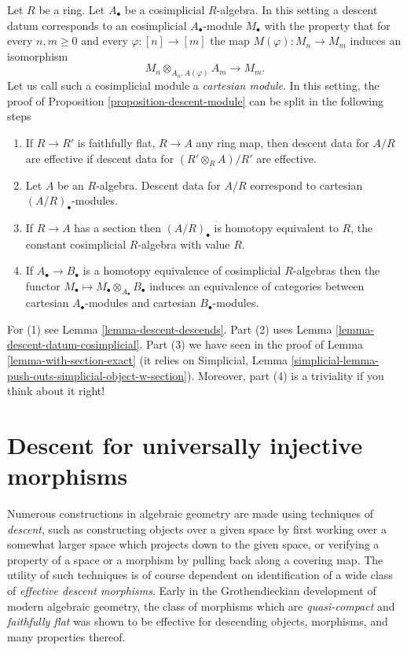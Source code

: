 \begin{remark}
\label{remark-homotopy-equivalent-cosimplicial-algebras}
Let $R$ be a ring. Let $A_\bullet$ be a cosimplicial $R$-algebra.
In this setting a descent datum corresponds to an cosimplicial
$A_\bullet$-module $M_\bullet$ with the property that for
every $n, m \geq 0$ and every $\varphi : [n] \to [m]$ the
map $M(\varphi) : M_n \to M_m$ induces an isomorphism
$$
M_n \otimes_{A_n, A(\varphi)} A_m \longrightarrow M_m.
$$
Let us call such a cosimplicial module a {\it cartesian module}.
In this setting, the proof of Proposition \ref{proposition-descent-module}
can be split in the following steps
\begin{enumerate}
\item If $R \to R'$ is faithfully flat, $R \to A$ any ring map,
then descent data for $A/R$ are effective if
descent data for $(R' \otimes_R A)/R'$ are effective.
\item Let $A$ be an $R$-algebra. Descent data for $A/R$ correspond
to cartesian $(A/R)_\bullet$-modules.
\item If $R \to A$ has a section then $(A/R)_\bullet$ is homotopy
equivalent to $R$, the constant cosimplicial
$R$-algebra with value $R$.
\item If $A_\bullet \to B_\bullet$ is a homotopy equivalence of
cosimplicial $R$-algebras then the functor
$M_\bullet \mapsto M_\bullet \otimes_{A_\bullet} B_\bullet$
induces an equivalence of categories between cartesian
$A_\bullet$-modules and cartesian $B_\bullet$-modules.
\end{enumerate}
For (1) see Lemma \ref{lemma-descent-descends}.
Part (2) uses Lemma \ref{lemma-descent-datum-cosimplicial}.
Part (3) we have seen in the proof of Lemma \ref{lemma-with-section-exact}
(it relies on Simplicial,
Lemma \ref{simplicial-lemma-push-outs-simplicial-object-w-section}).
Moreover, part (4) is a triviality if you think about it right!
\end{remark}








\section{Descent for universally injective morphisms}
\label{section-descent-universally-injective}

\noindent
Numerous constructions in algebraic geometry are made using techniques of 
{\it descent}, such as constructing objects over a given space by first
working over a somewhat larger space which projects down to the given space,
or verifying a property of a space or a morphism by pulling back along a
covering map. The utility of such techniques is of course  dependent on
identification of a wide class of {\it effective descent morphisms}.
Early in the Grothendieckian development of modern algebraic geometry,
the class of morphisms which are {\it quasi-compact} and {\it faithfully flat} 
was shown to be effective for descending objects, morphisms, and many
properties thereof. 

